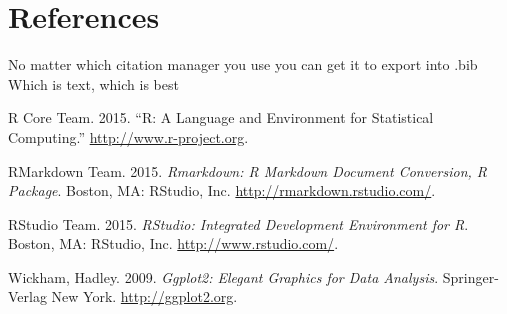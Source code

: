 \documentclass[]{article}
\begin{document}
\section{References}\label{references}

No matter which citation manager you use you can get it to export into
.bib Which is text, which is best

\hypertarget{refs}{}
\hypertarget{ref-RCoreTeam}{}
R Core Team. 2015. ``R: A Language and Environment for Statistical
Computing.'' \url{http://www.r-project.org}.

\hypertarget{ref-RMarkdown}{}
RMarkdown Team. 2015. \emph{Rmarkdown: R Markdown Document Conversion, R
Package}. Boston, MA: RStudio, Inc. \url{http://rmarkdown.rstudio.com/}.

\hypertarget{ref-RStudio}{}
RStudio Team. 2015. \emph{RStudio: Integrated Development Environment
for R}. Boston, MA: RStudio, Inc. \url{http://www.rstudio.com/}.

\hypertarget{ref-ggplot}{}
Wickham, Hadley. 2009. \emph{Ggplot2: Elegant Graphics for Data
Analysis}. Springer-Verlag New York. \url{http://ggplot2.org}.
\end{document}
